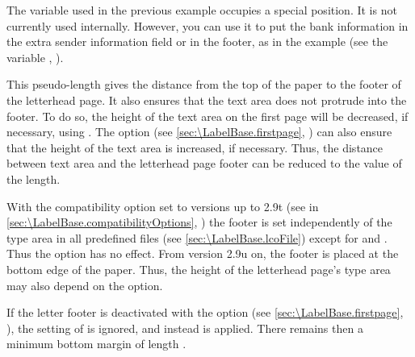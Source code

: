 \begin{Declaration}
\end{Declaration}%
%
The  variable used in the previous example
occupies a special position. It is not currently used internally. However, you
can use it to put the bank information in the
extra sender information field or in the footer, as in the example (see
the variable ,
).%
%
\EndIndexGroup


\begin{Declaration}
\end{Declaration}
This pseudo-length gives the distance from the top of the paper to the footer
of the letterhead page. It also ensures that the text area does not protrude
into the footer. To do so, the height of the text area on the first page will
be decreased, if necessary, using
%
. The
%
 option (see
\autoref{sec:\LabelBase.firstpage},
) can also ensure that the
height of the text area is increased, if necessary. Thus, the distance between
text area and the letterhead page footer can be reduced to the value of the
 length.

With the compatibility option
set to versions up to
2.9t (see
 in
\autoref{sec:\LabelBase.compatibilityOptions},
) the footer is set independently of the
type area in all predefined  files (see \autoref{sec:\LabelBase.lcoFile})
except for  and . Thus the
%
 option has no effect.
From version 2.9u on, the footer is placed at the bottom edge of the paper.
Thus, the height of the letterhead page's type area may also depend on the
 option.

If the letter footer is deactivated with the
%
%
option (see \autoref{sec:\LabelBase.firstpage},
), the setting of
 is ignored, and instead
 is applied. There remains then a
minimum bottom margin of length .%
\EndIndexGroup


